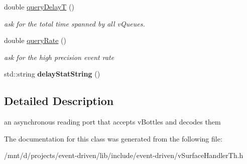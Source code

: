 \begin{DoxyCompactItemize}
\mbox{\label{classev_1_1queueAllocator_a439a2729d5474986977e26e63a9edf03}} 
double \hyperlink{classev_1_1queueAllocator_a439a2729d5474986977e26e63a9edf03}{query\+DelayT} ()
\begin{DoxyCompactList}\small\item\em ask for the total time spanned by all v\+Queues. \end{DoxyCompactList}\item 
\mbox{\label{classev_1_1queueAllocator_a39005a8e9337279debe435ae26c7d6fd}} 
double \hyperlink{classev_1_1queueAllocator_a39005a8e9337279debe435ae26c7d6fd}{query\+Rate} ()
\begin{DoxyCompactList}\small\item\em ask for the high precision event rate \end{DoxyCompactList}\item 
\mbox{\label{classev_1_1queueAllocator_a10282570a776a59efd302bb336109748}} 
std\+::string {\bfseries delay\+Stat\+String} ()
\end{DoxyCompactItemize}


\subsection{Detailed Description}
an asynchronous reading port that accepts v\+Bottles and decodes them 

The documentation for this class was generated from the following file\+:\begin{DoxyCompactItemize}
\item 
/mnt/d/projects/event-\/driven/lib/include/event-\/driven/v\+Surface\+Handler\+Th.\+h\end{DoxyCompactItemize}
